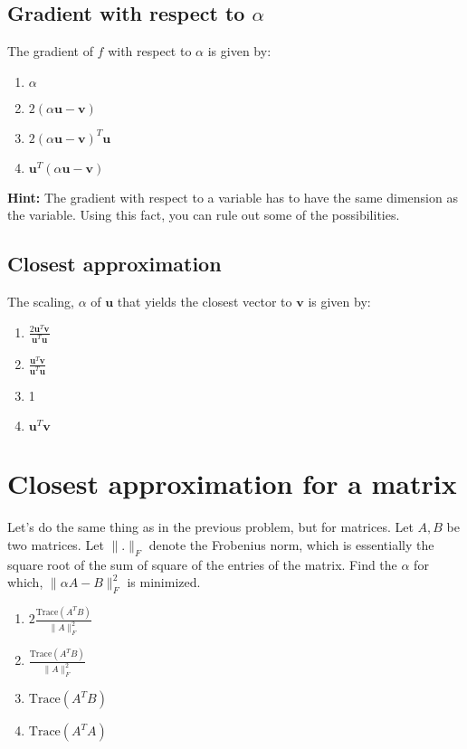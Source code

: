 \documentclass[twoside]{article}
\newcommand{\trace}{\mbox{Trace}}
\newcommand{\bu}{\mathbf{u}}
\newcommand{\bv}{\mathbf{v}}
\begin{document}
\subsection{Gradient with respect to $\alpha$}
The gradient of $f$ with respect to $\alpha$ is given by:

\begin{enumerate}
\item $\alpha$
\item $2(\alpha \bu - \bv)$
\item $2(\alpha \bu - \bv)^T\bu$
\item $\bu^T(\alpha \bu - \bv)$
\end{enumerate}

\textbf{Hint: } The gradient with respect to a variable has to have the same dimension as the variable. Using this fact, you can rule out some of the possibilities.


\subsection{Closest approximation}
The scaling, $\alpha$ of $\bu$ that yields the closest vector to $\bv$ is given by:

\begin{enumerate}
\item $\frac{2\bu^T\bv}{\bu^T\bu}$
\item $\frac{\bu^T\bv}{\bu^T\bu}$
\item 1
\item $\bu^T\bv$
\end{enumerate}

\section{Closest approximation for a matrix}
Let's do the same thing as in the previous problem, but for matrices. Let $A,B$ be two matrices.
Let $\|.\|_F$ denote the Frobenius norm, which is essentially the square root of the sum of square of the entries of the matrix.
Find the $\alpha$ for which, $\|\alpha A - B\|_F^2$ is minimized.

\begin{enumerate}
\item $2\frac{\trace(A^TB)}{\|A\|_F^2}$
\item $\frac{\trace(A^TB)}{\|A\|_F^2}$
\item $\trace(A^TB)$
\item $\trace(A^TA)$
\end{enumerate}
\end{document}
